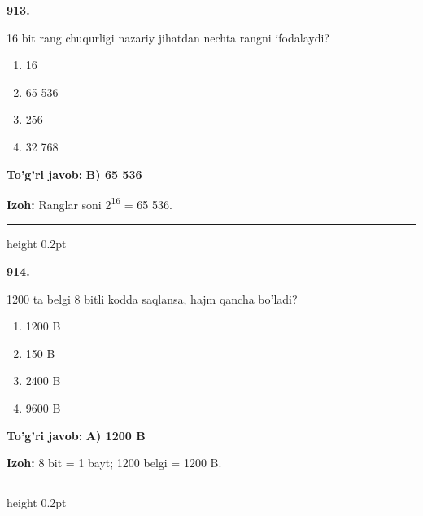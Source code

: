 \documentclass[10pt,a4paper,oneside]{article}
\begin{document}
\noindent\textbf{\color{ink}913.}
\par
16 bit rang chuqurligi nazariy jihatdan nechta rangni ifodalaydi?
\begin{enumerate}[label=\Alph*),leftmargin=9mm]
\item 16
\item 65 536
\item 256
\item 32 768
\end{enumerate}
\begin{tcolorbox}[enhanced,breakable,colback=teal!4,colframe=teal!50!black,boxrule=0.5pt,arc=1.1mm,left=3mm,right=3mm,top=1.7mm,bottom=1.7mm,before skip=2mm,after skip=2mm]
\textbf{\color{teal}To'g'ri javob:} \textbf{B) 65 536}
\par\smallskip
\textbf{Izoh:} Ranglar soni 2\textsuperscript{1}\textsuperscript{6} = 65 536.
\end{tcolorbox}
\vspace{2mm}\hrule height 0.2pt \vspace{3mm}

\noindent\textbf{\color{ink}914.}
\par
1200 ta belgi 8 bitli kodda saqlansa, hajm qancha bo'ladi?
\begin{enumerate}[label=\Alph*),leftmargin=9mm]
\item 1200 B
\item 150 B
\item 2400 B
\item 9600 B
\end{enumerate}
\begin{tcolorbox}[enhanced,breakable,colback=teal!4,colframe=teal!50!black,boxrule=0.5pt,arc=1.1mm,left=3mm,right=3mm,top=1.7mm,bottom=1.7mm,before skip=2mm,after skip=2mm]
\textbf{\color{teal}To'g'ri javob:} \textbf{A) 1200 B}
\par\smallskip
\textbf{Izoh:} 8 bit = 1 bayt; 1200 belgi = 1200 B.
\end{tcolorbox}
\vspace{2mm}\hrule height 0.2pt \vspace{3mm}
\end{document}
